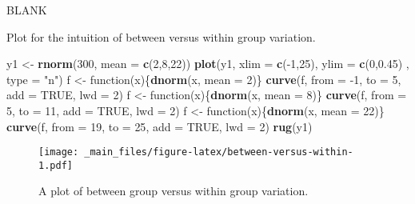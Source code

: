 \documentclass[]{book}
\newenvironment{Shaded}{\begin{snugshade}}{\end{snugshade}}
\newcommand{\KeywordTok}[1]{\textcolor[rgb]{0.13,0.29,0.53}{\textbf{{#1}}}}
\newcommand{\DataTypeTok}[1]{\textcolor[rgb]{0.13,0.29,0.53}{{#1}}}
\newcommand{\DecValTok}[1]{\textcolor[rgb]{0.00,0.00,0.81}{{#1}}}
\newcommand{\FloatTok}[1]{\textcolor[rgb]{0.00,0.00,0.81}{{#1}}}
\newcommand{\StringTok}[1]{\textcolor[rgb]{0.31,0.60,0.02}{{#1}}}
\newcommand{\OtherTok}[1]{\textcolor[rgb]{0.56,0.35,0.01}{{#1}}}
\newcommand{\NormalTok}[1]{{#1}}
\numberwithin{equation}{chapter}
\numberwithin{figure}{chapter}
\theoremstyle{plain}
\theoremstyle{definition}
\theoremstyle{remark}
\theoremstyle{definition}
\theoremstyle{definition}
\theoremstyle{remark}
\begin{document}
BLANK

Plot for the intuition of between versus within group variation.

\begin{Shaded}
\begin{Highlighting}[]
\NormalTok{y1 <-}\StringTok{ }\KeywordTok{rnorm}\NormalTok{(}\DecValTok{300}\NormalTok{, }\DataTypeTok{mean =} \KeywordTok{c}\NormalTok{(}\DecValTok{2}\NormalTok{,}\DecValTok{8}\NormalTok{,}\DecValTok{22}\NormalTok{))}
\KeywordTok{plot}\NormalTok{(y1, }\DataTypeTok{xlim =} \KeywordTok{c}\NormalTok{(-}\DecValTok{1}\NormalTok{,}\DecValTok{25}\NormalTok{), }\DataTypeTok{ylim =} \KeywordTok{c}\NormalTok{(}\DecValTok{0}\NormalTok{,}\FloatTok{0.45}\NormalTok{) , }\DataTypeTok{type =} \StringTok{"n"}\NormalTok{)}
\NormalTok{f <-}\StringTok{ }\NormalTok{function(x)\{}\KeywordTok{dnorm}\NormalTok{(x, }\DataTypeTok{mean =} \DecValTok{2}\NormalTok{)\}}
\KeywordTok{curve}\NormalTok{(f, }\DataTypeTok{from =} \NormalTok{-}\DecValTok{1}\NormalTok{, }\DataTypeTok{to =} \DecValTok{5}\NormalTok{, }\DataTypeTok{add =} \OtherTok{TRUE}\NormalTok{, }\DataTypeTok{lwd =} \DecValTok{2}\NormalTok{)}
\NormalTok{f <-}\StringTok{ }\NormalTok{function(x)\{}\KeywordTok{dnorm}\NormalTok{(x, }\DataTypeTok{mean =} \DecValTok{8}\NormalTok{)\}}
\KeywordTok{curve}\NormalTok{(f, }\DataTypeTok{from =} \DecValTok{5}\NormalTok{, }\DataTypeTok{to =} \DecValTok{11}\NormalTok{, }\DataTypeTok{add =} \OtherTok{TRUE}\NormalTok{, }\DataTypeTok{lwd =} \DecValTok{2}\NormalTok{)}
\NormalTok{f <-}\StringTok{ }\NormalTok{function(x)\{}\KeywordTok{dnorm}\NormalTok{(x, }\DataTypeTok{mean =} \DecValTok{22}\NormalTok{)\}}
\KeywordTok{curve}\NormalTok{(f, }\DataTypeTok{from =} \DecValTok{19}\NormalTok{, }\DataTypeTok{to =} \DecValTok{25}\NormalTok{, }\DataTypeTok{add =} \OtherTok{TRUE}\NormalTok{, }\DataTypeTok{lwd =} \DecValTok{2}\NormalTok{)}
\KeywordTok{rug}\NormalTok{(y1)}
\end{Highlighting}
\end{Shaded}

\begin{figure}[htbp]
\centering
\texttt{[image: \_main\_files/figure-latex/between-versus-within-1.pdf]}
\caption{\label{fig:between-versus-within}\small A plot of between group versus
within group variation.}
\end{figure}
\end{document}
